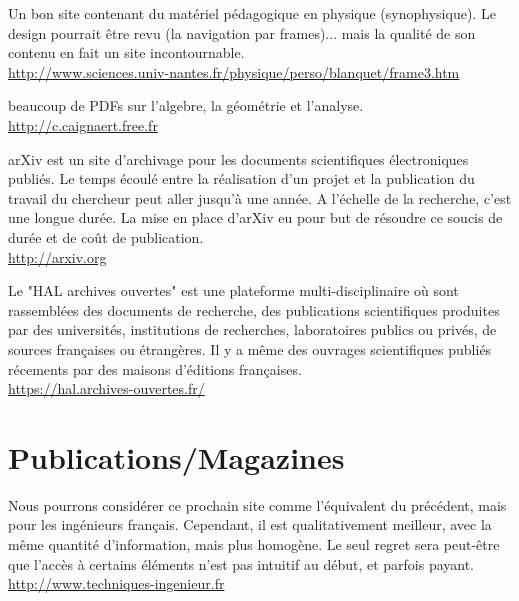 	{\Large {}}{\Large {}}\bcdfrance{} Un bon site contenant du matériel pédagogique en physique (synophysique). Le design pourrait être revu (la navigation par frames)... mais la qualité de son contenu en fait un site incontournable.\\
	\href{http://www.sciences.univ-nantes.fr/physique/perso/blanquet/frame3.htm}{\color{blue} http://www.sciences.univ-nantes.fr/physique/perso/blanquet/frame3.htm}
	
	{\Large {}}{\Large {}}{\Large {}}\bcdfrance{} beaucoup de PDFs sur l'algebre, la géométrie et l'analyse.\\
	\href{http://c.caignaert.free.fr}{\color{blue} http://c.caignaert.free.fr}
	
	{\Large {}}{\Large {}}{\Large {}} arXiv est un site d'archivage pour les documents scientifiques électroniques publiés. Le temps écoulé entre la réalisation d'un projet et la publication du travail du chercheur peut aller jusqu'à une année. A l'échelle de la recherche, c'est une longue durée. La mise en place d'arXiv eu pour but de résoudre ce soucis de durée et de coût de publication.\\
	\href{http://arxiv.org}{\color{blue} http://arxiv.org}
	
	{\Large {}}{\Large {}}{\Large {}}\bcdfrance{} Le "HAL archives ouvertes" est une plateforme multi-disciplinaire où sont rassemblées des documents de recherche, des publications scientifiques produites par des universités, institutions de recherches, laboratoires publics ou privés, de sources françaises ou étrangères. Il y a même des ouvrages scientifiques publiés récements par des maisons d'éditions françaises.\\
	\href{https://hal.archives-ouvertes.fr/}{\color{blue} https://hal.archives-ouvertes.fr/}
	
	\pagebreak
	\section{Publications/Magazines}

	{\Large {}}{\Large {}}{\Large {}}{\Large {}}{\Large {}}\bcdfrance{} Nous pourrons considérer ce prochain site comme l'équivalent du précédent, mais pour les ingénieurs français. Cependant, il est qualitativement meilleur, avec la même quantité d'information, mais plus homogène. Le seul regret sera peut-être que l'accès à certains éléments n'est pas intuitif au début, et parfois payant.\\
	\href{http://www.techniques-ingenieur.fr}{\color{blue} http://www.techniques-ingenieur.fr}
	

